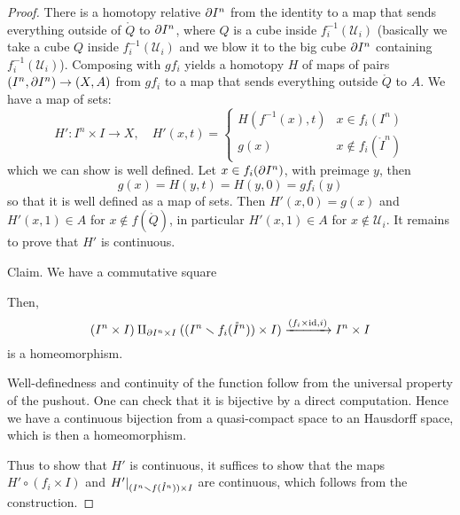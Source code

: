\begin{proof}
There is a homotopy relative $\partial I^n$ from the identity to a map that sends everything outside of $\ring Q$ to $\partial I^n$, where $Q$ is a cube inside $f^{-1}_i(\mathcal{U}_i)$ (basically we take a cube $Q$ inside $f^{-1}_i(\mathcal{U}_i)$ and we blow it to the big cube $\partial I^n$ containing $f^{-1}_i(\mathcal{U}_i)$). Composing with $gf_i$ yields a homotopy $H$ of maps of pairs $(I^n,\partial I^n)\to(X,A)$ from $gf_i$ to a map that sends everything outside $\ring Q$ to $A$. We have a map of sets:
\[H':I^n\times I\to X,\quad H'(x,t)=\begin{cases}H(f^{-1}(x),t) & x\in f_i(I^n) \\ g(x) & x\not\in f_i(\mathring{I}^n)\end{cases}\]
which we can show is well defined. Let $x\in f_i(\partial I^n)$, with preimage $y$, then\normalmarginpar{} \[g(x)=H(y,t)=H(y,0)=gf_i(y)\] so that it is well defined as a map of sets. Then $H'(x,0)=g(x)$ and $H'(x,1)\in A$ for $x\not\in f(\mathring{Q})$, in particular $H'(x,1)\in A$ for $x\not\in\mathcal{U}_i$. It remains to prove that $H'$ is continuous.

Claim. We have a commutative square
\begin{center}
\end{center}
Then,
\[(I^n\times I)\amalg_{\partial I^n\times I} ((I^n\smallsetminus f_i(\mathring{I}^n))\times I)\xrightarrow{(f_i\times\operatorname{id},i)} I^n\times I\]
is a homeomorphism.

\begin{claimproof}
Well-definedness and continuity of the function follow from the universal property of the pushout. One can check that it is bijective by a direct computation. Hence we have a continuous bijection from a quasi-compact space to an Hausdorff space, which is then a homeomorphism. 
\end{claimproof}

Thus to show that $H'$ is continuous, it suffices to show that the maps $H'\circ (f_i\times I)$ and $H'|_{(I^n\smallsetminus f(\mathring I^n))\times I}$ are continuous, which follows from the construction.
\end{proof}

